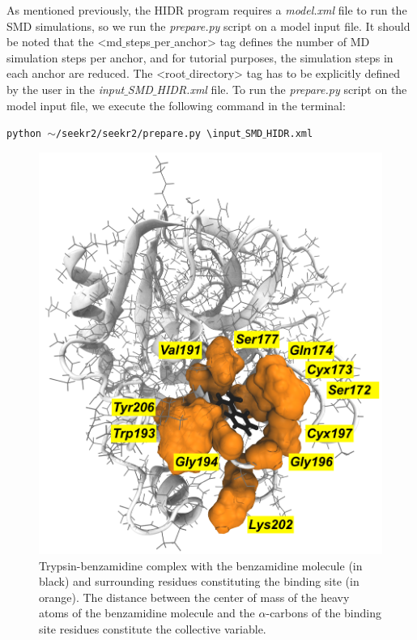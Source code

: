 \documentclass[9pt,training,pubversion]{livecoms}
\begin{document}
\noindent As mentioned previously, the HIDR program requires a \textit{model.xml} file to run the SMD simulations, so we run the \textit{prepare.py} script on a model input file. It should be noted that the  <md$\_$steps$\_$per$\_$anchor> tag defines the number of MD simulation steps per anchor, and for tutorial purposes, the simulation steps in each anchor are reduced. The <root$\_$directory> tag has to be explicitly defined by the user in the \textit{input$\_$SMD$\_$HIDR.xml} file. To run the \textit{prepare.py} script on the model input file, we execute the following command in the terminal:

\begin{tcolorbox}[colback=black!8!white, colframe=black!50!black, fontlower=\tiny, left=2pt, right=2pt, top=2pt, bottom=2pt] 
\texttt{python $\sim$/seekr2/seekr2/prepare.py \textbackslash \linebreak input$\_$SMD$\_$HIDR.xml}
\end{tcolorbox}

\begin{figure}[H]
\centering
\includegraphics[scale=0.16]{images/figure7.png} 
\caption{Trypsin-benzamidine complex with the benzamidine molecule (in black) and surrounding residues constituting the binding site (in orange). The distance between the center of mass of the heavy atoms of the benzamidine molecule and the $\alpha$-carbons of the binding site residues constitute the collective variable.}
\label{figure7}
\end{figure} 
\end{document}
